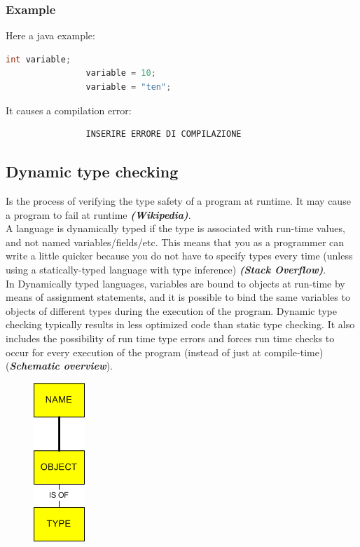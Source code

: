 \documentclass[12pt]{article}
\begin{document}
		\subsubsection{Example}	
			Here a java example: 
			\begin{lstlisting}[language=Java]
				int variable;
				variable = 10;
				variable = "ten";
			\end{lstlisting}
			It causes a compilation error:
			\begin{lstlisting}
				INSERIRE ERRORE DI COMPILAZIONE
			\end{lstlisting}
			
	\subsection{Dynamic type checking}
		Is the process of verifying the type safety of a program at runtime. It may cause a program to fail at runtime \textit{\textbf{(Wikipedia)}}.\\
		A language is dynamically typed if the type is associated with run-time values, and not named variables/fields/etc. This means that you as a programmer can write a little quicker because you do not have to specify types every time (unless using a statically-typed language with type inference) \textit{\textbf{(Stack Overflow)}}.\\
		In Dynamically typed languages, variables are bound to objects at run-time by means of assignment statements, and it is possible to bind the same variables to objects of different types during the execution of the program.
		Dynamic type checking typically results in less optimized code than static type checking. It also includes the possibility of run time type errors and forces run time checks to occur for every execution of the program (instead of just at compile-time) (\textbf{\textit{Schematic overview}}).\\
		
		\begin{figure}[h!]
			\centering
			\includegraphics[scale=0.60]{img/dynamic.png}
		\end{figure}
	
\end{document}
